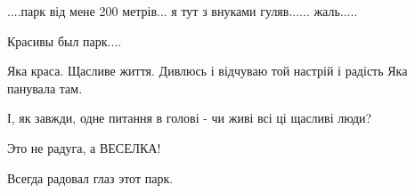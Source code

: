  
 
 
 
 

\qqSecCmt


....парк від мене 200 метрів... я тут з внуками гуляв...... жаль.....


Красивы был парк....


Яка краса. Щасливе життя. Дивлюсь і відчуваю той настрій і радість Яка панувала там.


І, як завжди, одне питання в голові - чи живі всі ці щасливі люди?


Это не радуга, а ВЕСЕЛКА!


Всегда радовал глаз этот парк.
